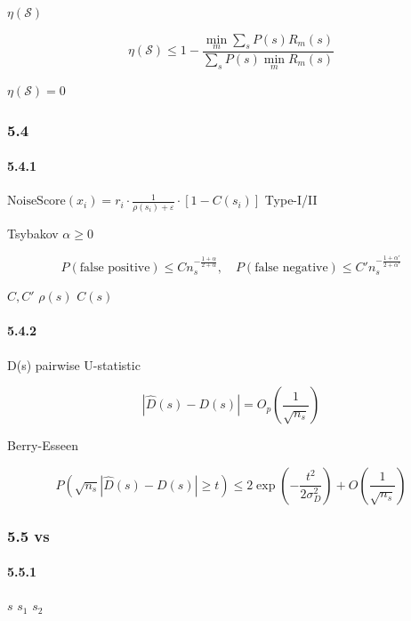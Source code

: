 \documentclass[
  12pt,
]{article}
\begin{document}
 \(\eta(\mathcal{S})\) 

\[\eta(\mathcal{S}) \leq 1 - \frac{\min_m \sum_s P(s) R_m(s)}{\sum_s P(s) \min_m R_m(s)}\]

\(\eta(\mathcal{S}) = 0\)

\subsubsection{5.4
}\label{ux566aux58f0ux6761ux4ef6ux4e0bux7684ux8fb9ux754c}

\paragraph{5.4.1
}\label{ux566aux58f0ux5206ux6570ux7684ux7edfux8ba1ux4e00ux81f4ux6027}


\(\text{NoiseScore}(x_i) = r_i \cdot \frac{1}{\rho(s_i)+\varepsilon} \cdot [1 - C(s_i)]\)
 Type-I/II 

 Tsybakov  \(\alpha \geq 0\) 

\[P(\text{false positive}) \leq C n_s^{-\frac{1+\alpha}{2+\alpha}}, \quad P(\text{false negative}) \leq C' n_s^{-\frac{1+\alpha'}{2+\alpha'}}\]

 \(C, C'\)  \(\rho(s)\)  \(C(s)\) 

\paragraph{5.4.2
}\label{ux5197ux4f59ux68c0ux6d4bux7684ux7cbeux5ea6}

D(s)  pairwise  U-statistic 

\[|\hat{D}(s) - D(s)| = O_p\left(\frac{1}{\sqrt{n_s}}\right)\]

 Berry-Esseen 

\[P\left(\sqrt{n_s} |\hat{D}(s) - D(s)| \geq t\right) \leq 2 \exp\left(-\frac{t^2}{2\sigma_D^2}\right) + O\left(\frac{1}{\sqrt{n_s}}\right)\]

\subsubsection{5.5  vs
}\label{ux72b6ux6001ux5206ux88c2-vs-ux5408ux5e76ux7684ux4e92ux4fe1ux606fux6743ux8861}

\paragraph{5.5.1
}\label{ux5206ux88c2ux7684ux4fe1ux606fux589eux76ca}

 \(s\)  \(s_1\)  \(s_2\) 
\end{document}
